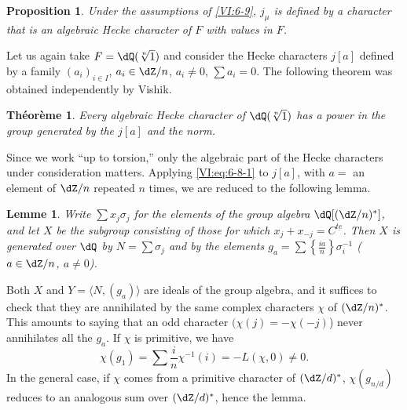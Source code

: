 \documentclass[oneside]{book}
\newcounter{char}
\theoremstyle{sga-source}
\theoremstyle{sga-source-dash}
\theoremstyle{sga-source-dotdash}
\theoremstyle{sga-source-number-note-dash}
\theoremstyle{sga-source-note-number-dotdash}
\theoremstyle{sga-source-example-dotdash}
\theoremstyle{sga-source-inline-number}
\theoremstyle{sga-source-bare-number}
\theoremstyle{sga-source}
\newtheorem{lemma_}[subsection]{Lemme}
\newtheorem{theorem_}[subsection]{Théorème}
\newtheorem{proposition_}[subsection]{Proposition}
\newcommand{\PrintPage}[1]{}\newcommand{\MathPage}[1]{}\newcommand{\PrintCite}[2]{#1}\newcommand{\var}[3]{#2}
\begin{document}
\begin{proposition_}\label{VI:6-10}
Under the assumptions of \ref{VI:6-9}, $j_\mu$ is defined by a character 
that is an algebraic Hecke character of $F$ with values in $F$. 
\end{proposition_}

Let us again take $F=\dQ(\sqrt[n]{1})$ and consider the Hecke characters 
$j[a]$ defined by a family $(a_i)_{i\in I}$, $a_i\in \dZ/n$, 
$a_i\ne 0$, $\sum a_i=0$. The following theorem was obtained 
independently by Vishik. 





\begin{theorem_}\label{VI:6-11}
Every algebraic Hecke character of $\dQ(\sqrt[n]{1})$ has a power 
in the group generated by the $j[a]$ and the norm. 
\end{theorem_}

Since we work ``up to torsion,'' only the algebraic part of the 
Hecke characters under consideration matters. Applying \eqref{VI:eq:6-8-1} to 
$j[a]$, with $a=$ an element of $\dZ/n$ repeated $n$ times, we 
are reduced to the following lemma.





\begin{lemma_}\label{VI:6-12}
Write $\sum x_j \sigma_j$ for the elements of the group algebra 
  $\dQ[(\dZ/n)^\ast]$, and let $X$ be the subgroup consisting of those for which 
$x_j+x_{-j}=C^{\underline{t e}}$. Then $X$ is generated over $\dQ$ by 
$N=\sum \sigma_j$ and by the elements 
  $g_a=\sum \left\{ \frac{i a}{n}\right\} \sigma_i^{-1}$ 
($a\in \dZ/n$, $a\ne 0$). 
\end{lemma_}

\PrintPage{218}
Both $X$ and $Y=\langle N,(g_a)\rangle$ are ideals of the group 
algebra, and it suffices to check that they are annihilated by the same 
complex characters $\chi$ of $(\dZ/n)^\ast$. This amounts to saying that an odd character $(\chi(j)=-\chi(-j)$) never annihilates all the $g_a$. If 
$\chi$ is primitive, we have 
\[
  \chi(g_1) = \sum \frac i n \chi^{-1}(i) = -L(\chi,0)\ne 0 \text{.} 
\]
In the general case, if $\chi$ comes from a primitive character of 
  $(\dZ/d)^\ast$, $\chi(g_{n/d})$ reduces to an analogous sum over 
  $(\dZ/d)^\ast$, hence the lemma. 
\end{document}
